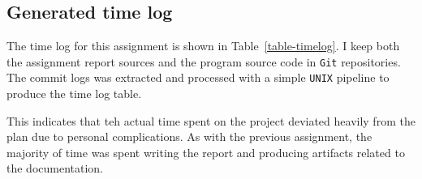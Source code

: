 \subsection{Generated time log}\label{time-log-result}

The time log for this assignment is shown in Table~\ref{table-timelog}.  I keep
both the assignment report \latex sources and the program source code in
\texttt{Git} repositories. The commit logs was extracted and processed with a
simple \texttt{UNIX} pipeline to produce the time log table.

This indicates that teh actual time spent on the project deviated heavily from
the plan due to personal complications.
As with the previous assignment, the majority of time was spent writing the
report and producing artifacts related to the documentation.


